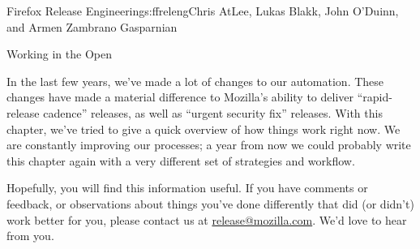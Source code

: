 \begin{aosachapter}{Firefox Release Engineering}{s:ffreleng}{Chris AtLee, Lukas Blakk, John O'Duinn, and Armen Zambrano Gasparnian}
\begin{aosasect1}{Working in the Open}
\begin{aosaitemize}
\end{aosaitemize}

In the last few years, we've made a lot of changes to our automation.
These changes have made a material difference to Mozilla's ability to
deliver ``rapid-release cadence'' releases, as well as ``urgent
security fix'' releases. With this chapter, we've
tried to give a quick overview of how things work right now. We are
constantly improving our processes; a year from now we could probably
write this chapter again with a very different set of
strategies and workflow. 

Hopefully, you will find this information
useful. If you have comments or feedback, or observations about things you've
done differently that did (or didn't) work better for you, please contact
us at \url{release@mozilla.com}. We'd love to hear from you.
  
\end{aosasect1}

\end{aosachapter}

